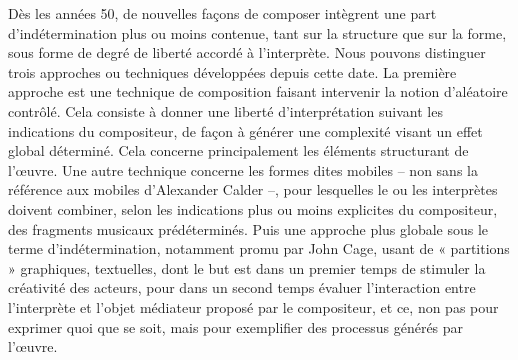 \bigskip

Dès les années 50, de nouvelles façons de composer intègrent une part d'indétermination plus ou moins contenue, tant sur la structure que sur la forme, sous forme de degré de liberté accordé à l'interprète. Nous pouvons distinguer trois approches ou techniques développées depuis cette date. La première approche est une technique de composition faisant intervenir la notion d'aléatoire contrôlé. Cela consiste à donner une liberté d'interprétation suivant les indications du compositeur, de façon à générer une complexité visant un effet global déterminé. Cela concerne principalement les éléments structurant de l'œuvre. Une autre technique concerne les formes dites mobiles -- non sans la référence aux mobiles d'Alexander Calder --, pour lesquelles le ou les interprètes doivent combiner, selon les indications plus ou moins explicites du compositeur, des fragments musicaux prédéterminés. Puis une approche plus globale sous le terme d'indétermination, notamment promu par John Cage, usant de « partitions » graphiques, textuelles, dont le but est dans un premier temps de stimuler la créativité des acteurs, pour dans un second temps évaluer l'interaction entre l'interprète et l'objet médiateur proposé par le compositeur, et ce, non pas pour exprimer quoi que se soit, mais pour exemplifier des processus générés par l'œuvre.

